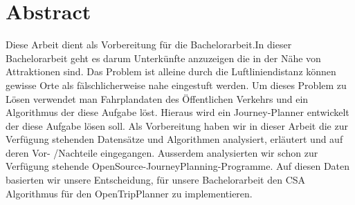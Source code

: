\section{Abstract}
\label{abstract}
Diese Arbeit dient als Vorbereitung für die Bachelorarbeit.In dieser Bachelorarbeit geht es darum Unterkünfte anzuzeigen die in der Nähe von Attraktionen sind. Das Problem ist alleine durch die Luftliniendistanz können gewisse Orte als fälschlicherweise nahe eingestuft werden. Um dieses Problem zu Lösen verwendet man Fahrplandaten des Öffentlichen Verkehrs und ein Algorithmus der diese Aufgabe löst. Hieraus wird ein Journey-Planner entwickelt der diese Aufgabe lösen soll.
\newline
\newline
Als Vorbereitung haben wir in dieser Arbeit die zur Verfügung stehenden Datensätze und Algorithmen analysiert, erläutert und auf deren Vor- /Nachteile eingegangen. Ausserdem analysierten wir schon zur Verfügung stehende OpenSource-JourneyPlanning-Programme.
\newline
\newline
Auf diesen Daten basierten wir unsere Entscheidung, für unsere Bachelorarbeit den CSA Algorithmus für den OpenTripPlanner zu implementieren. 
